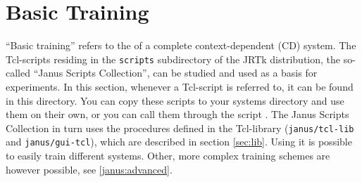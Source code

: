
\section{Basic Training} \label{janus:basic}

``Basic  training'' refers   to the    of  a complete
context-dependent   (CD) system.    The  Tcl-scripts   residing in the
\texttt{scripts} subdirectory of the  JRTk distribution, the so-called
``Janus Scripts Collection'', can be  studied and used  as a basis for
experiments. In this section, whenever a Tcl-script is referred to, it
can be  found in this directory.   You can copy  these scripts to your
systems directory  and use them  on their own,  or  you can  call them
through   the  script  .   The   Janus Scripts
Collection  in  turn uses the procedures  defined   in the Tcl-library
(\texttt{janus/tcl-lib}    and \texttt{janus/gui-tcl}), which      are
described in section \ref{sec:lib}.  Using  it
is possible  to easily train  different  systems. Other,  more complex
training schemes are however possible, see \ref{janus:advanced}.

